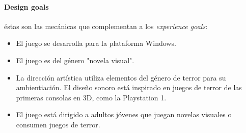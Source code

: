 \paragraph{Design goals} éstas son las mecánicas que complementan a los \textit{experience goals}:
\begin{itemize}
  \item El juego se desarrolla para la plataforma Windows.
  \item El juego es del género "novela visual".
  \item La dirección artística utiliza elementos del género de terror para su ambientiación. El diseño sonoro está inspirado en juegos de terror de las primeras consolas en 3D, como la Playstation 1.
  \item El juego está dirigido a adultos jóvenes que juegan novelas visuales o consumen juegos de terror. 
\end{itemize}